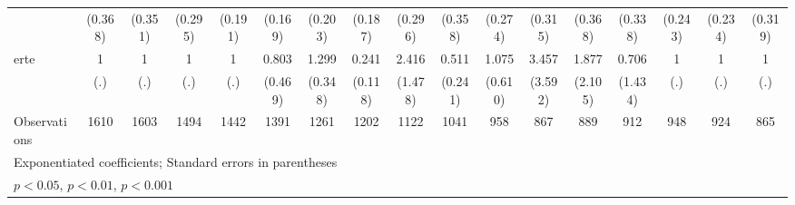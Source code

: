 {\begin{tabular}{l*{16}{c}}
                    &     (0.368)         &     (0.351)         &     (0.295)         &     (0.191)         &     (0.169)         &     (0.203)         &     (0.187)         &     (0.296)         &     (0.358)         &     (0.274)         &     (0.315)         &     (0.368)         &     (0.338)         &     (0.243)         &     (0.234)         &     (0.319)         \\
[1em]
erte                &           1         &           1         &           1         &           1         &       0.803         &       1.299         &       0.241\sym{**} &       2.416         &       0.511         &       1.075         &       3.457         &       1.877         &       0.706         &           1         &           1         &           1         \\
                    &         (.)         &         (.)         &         (.)         &         (.)         &     (0.469)         &     (0.348)         &     (0.118)         &     (1.478)         &     (0.241)         &     (0.610)         &     (3.592)         &     (2.105)         &     (1.434)         &         (.)         &         (.)         &         (.)         \\
\hline
Observations        &        1610         &        1603         &        1494         &        1442         &        1391         &        1261         &        1202         &        1122         &        1041         &         958         &         867         &         889         &         912         &         948         &         924         &         865         \\
\hline\hline
\multicolumn{17}{l}{\footnotesize Exponentiated coefficients; Standard errors in parentheses}\\
\multicolumn{17}{l}{\footnotesize \sym{*} \(p<0.05\), \sym{**} \(p<0.01\), \sym{***} \(p<0.001\)}\\
\end{tabular}
}
